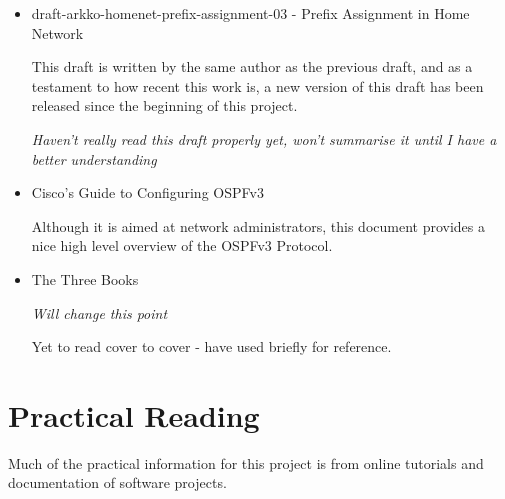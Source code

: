 \documentclass[12pt]{report}
\begin{document}
\begin{itemize}
	\item  draft-arkko-homenet-prefix-assignment-03 -
	Prefix Assignment in Home Network
 		
	This draft is written by the same author as the previous draft, and as a
	testament to how recent this work is, a new version of this draft has
	been released since the beginning of this project. 
	
	\em Haven't really read this draft properly yet, won't summarise it
	until I have a better understanding \em


	\item Cisco's Guide to Configuring OSPFv3 
	
	Although it is aimed at network administrators, this document provides a
	nice high level overview of the OSPFv3 Protocol.

	\item The Three Books

	\em Will change this point \em 
	
	Yet to read cover to cover - have used briefly for reference. 

\end{itemize}

\section{Practical Reading}		

Much of the practical information for this project is from online tutorials and
documentation of software projects.  
\end{document}
